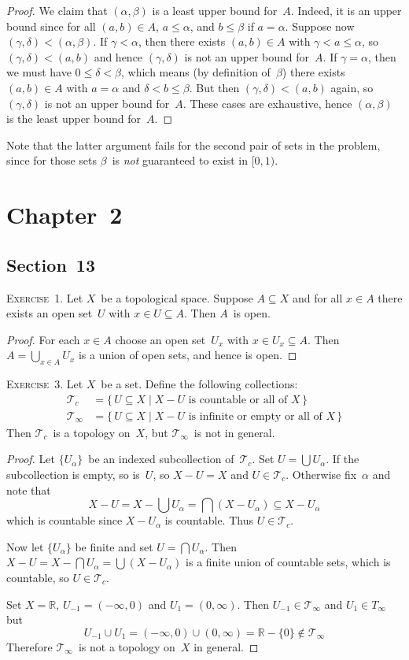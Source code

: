\documentclass[letterpaper]{article}
\newcommand{\exercise}[1]{\goodbreak\noindent\textsc{Exercise~{#1}.}}
\newcommand{\R}{\mathbb{R}}
\newcommand{\T}{\mathcal{T}}
\newcommand{\union}{\cup}
\newcommand{\bigsect}{\bigcap}
\newcommand{\bigunion}{\bigcup}
\begin{document}
\begin{enumerate}[itemsep=0pt]
\begin{proof}
We claim that $(\alpha,\beta)$ is a least upper bound for~$A$. Indeed, it is an upper bound since for all $(a,b)\in A$, $a\le\alpha$, and $b\le\beta$ if $a=\alpha$. Suppose now $(\gamma,\delta)<(\alpha,\beta)$. If $\gamma<\alpha$, then there exists $(a,b)\in A$ with $\gamma<a\le\alpha$, so $(\gamma,\delta)<(a,b)$ and hence $(\gamma,\delta)$ is not an upper bound for~$A$. If $\gamma=\alpha$, then we must have $0\le\delta<\beta$, which means (by definition of~$\beta$) there exists $(a,b)\in A$ with $a=\alpha$ and $\delta<b\le\beta$. But then $(\gamma,\delta)<(a,b)$ again, so $(\gamma,\delta)$ is not an upper bound for~$A$. These cases are exhaustive, hence $(\alpha,\beta)$ is the least upper bound for~$A$.
\end{proof}
\noindent Note that the latter argument fails for the second pair of sets in the problem, since for those sets $\beta$~is \emph{not} guaranteed to exist in $[0,1)$.
\end{enumerate}

\section*{Chapter~2}
\subsection*{Section~13}
\exercise{1}
Let $X$~be a topological space. Suppose $A\subseteq X$ and for all $x\in A$ there exists an open set~$U$ with $x\in U\subseteq A$. Then $A$~is open.
\begin{proof}
For each $x\in A$ choose an open set~$U_x$ with $x\in U_x\subseteq A$. Then $A=\bigunion_{x\in A}U_x$ is a union of open sets, and hence is open.
\end{proof}

\exercise{3}
Let $X$~be a set. Define the following collections:
\begin{align*}
\T_c&=\{\,U\subseteq X\mid X-U\text{ is countable or all of }X\,\}\\
\T_{\infty}&=\{\,U\subseteq X\mid X-U\text{ is infinite or empty or all of }X\,\}
\end{align*}
Then $\T_c$~is a topology on~$X$, but $\T_{\infty}$~is not in general.
\begin{proof}
Let $\{U_{\alpha}\}$~be an indexed subcollection of~$\T_c$. Set $U=\bigunion U_{\alpha}$. If the subcollection is empty, so is~$U$, so $X-U=X$ and $U\in\T_c$. Otherwise fix~$\alpha$ and note that
$$X-U=X-\bigunion U_{\alpha}=\bigsect(X-U_{\alpha})\subseteq X-U_{\alpha}$$
which is countable since $X-U_{\alpha}$ is countable. Thus $U\in\T_c$.

Now let $\{U_{\alpha}\}$ be finite and set $U=\bigsect U_{\alpha}$. Then $X-U=X-\bigsect U_{\alpha}=\bigunion(X-U_{\alpha})$ is a finite union of countable sets, which is countable, so $U\in\T_c$.

Set $X=\R$, $U_{-1}=(-\infty,0)$ and $U_1=(0,\infty)$. Then $U_{-1}\in\T_{\infty}$ and $U_1\in T_{\infty}$ but
$$U_{-1}\union U_1=(-\infty,0)\union(0,\infty)=\R-\{0\}\not\in\T_{\infty}$$
Therefore $\T_{\infty}$~is not a topology on~$X$ in general.
\end{proof}
\end{document}
